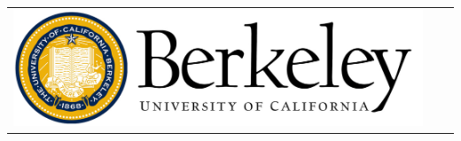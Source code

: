 \documentclass[final]{beamer}
\newlength{\onecolwid}
\begin{document}
\begin{frame}[t]
\begin{columns}[t]
\begin{column}{\onecolwid}
\begin{center}
\begin{tabular}{ccc}
\includegraphics[width=.4\linewidth]{berkeleylogo.jpg} 
\end{tabular}
\end{center}


\end{column} %

\end{columns} %

\end{frame} %
\end{document}
